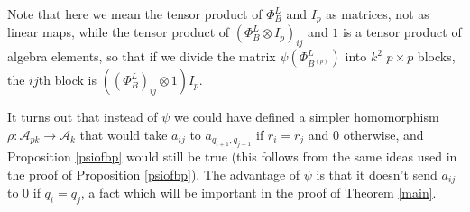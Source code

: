 \documentclass{amsart}[11pt,fullpage]
\def\A{{\mathcal A}}
\theoremstyle{definition}
\begin{document}
Note that here we mean the tensor product of $\Phi_B^L$ and $I_p$ as matrices, not as linear maps, while the tensor product of $\left(\Phi_B^L\otimes I_p\right)_{ij}$ and $1$ is a tensor product of algebra elements, so that if we divide the matrix $\psi(\Phi_{B^{(p)}}^L)$ into $k^2$ $p\times p$ blocks, the $ij$th block is $\left((\Phi_B^L)_{ij}\otimes 1\right)I_p$.

It turns out that instead of $\psi$ we could have defined a simpler homomorphism $\rho\colon \A_{pk}\rightarrow \A_k$ that would take $a_{ij}$ to $a_{q_{i+1},q_{j+1}}$ if $r_i=r_j$ and 0 otherwise, and Proposition \ref{psiofbp} would still be true (this follows from the same ideas used in the proof of Proposition \ref{psiofbp}). The advantage of $\psi$ is that it doesn't send $a_{ij}$ to 0 if $q_i=q_j$, a fact which will be important in the proof of Theorem \ref{main}.
\end{document}
